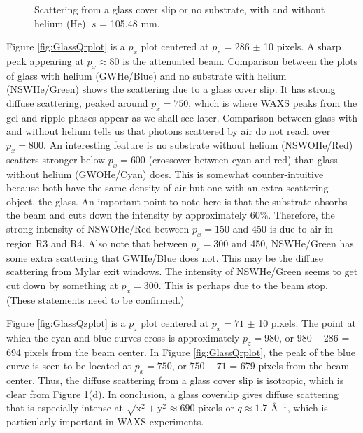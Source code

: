 \documentclass[letterpaper,12pt]{article}
\newcommand{\iang}{\AA$^{-1}$}%
\begin{document}
\begin{figure}[htbp]
	\qquad
	\caption[Scattering from a glass cover slip or no substrate, with and without helium (He)]{Scattering from a glass cover slip or no substrate, with and without helium (He). $s$ = 105.48 mm.} %
	\label{fig:Background}
\end{figure}

Figure \ref{fig:GlassQrplot} is a $p_x$ plot centered at $p_z$ = 286 $\pm$ 10 pixels. A sharp peak appearing at $p_x\approx 80$ is the attenuated beam. Comparison between the plots of glass with helium (GWHe/Blue) and no substrate with helium (NSWHe/Green) shows the scattering due to a glass cover slip. It has strong diffuse scattering, peaked around $p_x=750$, which is where WAXS peaks from the gel and ripple phases appear as we shall see later. Comparison between glass with and without helium tells us that photons scattered by air do not reach over $p_x=800$. An interesting feature is no substrate without helium (NSWOHe/Red) scatters stronger below $p_x=600$ (crossover between cyan and red) than glass without helium (GWOHe/Cyan) does. This is somewhat counter-intuitive because both have the same density of air but one with an extra scattering object, the glass. An important point to note here is that the substrate absorbs the beam and cuts down the intensity by approximately 60\%. Therefore, the strong intensity of NSWOHe/Red between $p_x=150$ and 450 is due to air in region R3 and R4. Also note that between $p_x=300$ and 450, NSWHe/Green has some extra scattering that GWHe/Blue does not. This may be the diffuse scattering from Mylar exit windows. The intensity of NSWHe/Green seems to get cut down by something at $p_x=300$. This is perhaps due to the beam stop. (These statements need to be confirmed.)

Figure \ref{fig:GlassQzplot} is a $p_z$ plot centered at $p_x=71$ $\pm$ 10 pixels. The point at which the cyan and blue curves cross is approximately $p_z=980$, or $980-286$ = 694 pixels from the beam center. In Figure \ref{fig:GlassQrplot}, the peak of the blue curve is seen to be located at $p_x=750$, or $750-71$ = 679 pixels from the beam center. Thus, the diffuse scattering from a glass cover slip is isotropic, which is clear from Figure \ref{fig:Background}(d). 
	In conclusion, a glass coverslip gives diffuse scattering that is especially intense at $\sqrt{\mathrm{x}^2+\mathrm{y}^2}\approx 690$ pixels or $q \approx 1.7$ \iang, which is particularly important in WAXS experiments. 
\end{document}
